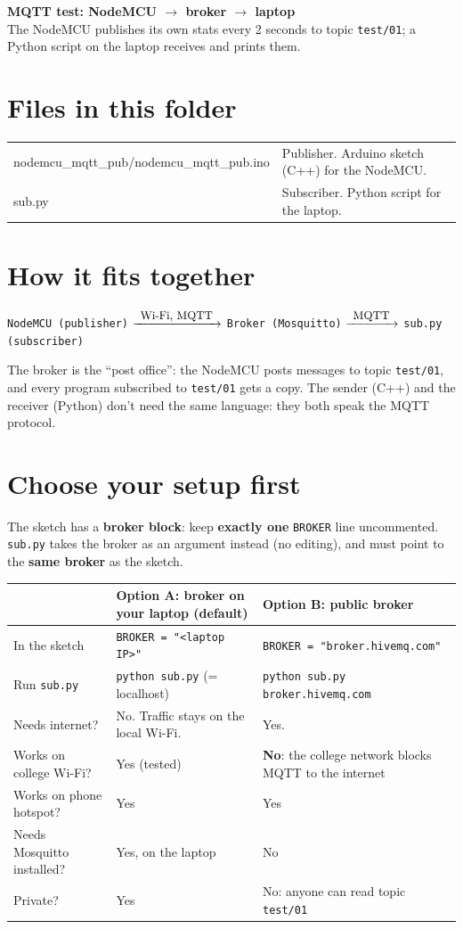 \documentclass[11pt]{article}
\begin{document}
{\LARGE\bfseries MQTT test: NodeMCU $\rightarrow$ broker $\rightarrow$ laptop}\\[4pt]
The NodeMCU publishes its own stats every 2 seconds to topic \texttt{test/01}; a Python script on the laptop receives and prints them.

\section*{Files in this folder}
\begin{tabular}{@{}>{\ttfamily}l l@{}}
nodemcu\_mqtt\_pub/nodemcu\_mqtt\_pub.ino & Publisher. Arduino sketch (C++) for the NodeMCU. \\
sub.py & Subscriber. Python script for the laptop. \\
\end{tabular}

\section*{How it fits together}
\begin{center}
\texttt{NodeMCU (publisher)} $\xrightarrow{\ \mbox{\small Wi-Fi, MQTT}\ }$
\texttt{Broker (Mosquitto)} $\xrightarrow{\ \mbox{\small MQTT}\ }$
\texttt{sub.py (subscriber)}
\end{center}
The broker is the ``post office'': the NodeMCU posts messages to topic \texttt{test/01}, and every program subscribed to \texttt{test/01} gets a copy.
The sender (C++) and the receiver (Python) don't need the same language: they both speak the MQTT protocol.

\section*{Choose your setup first}
The sketch has a \textbf{broker block}: keep \textbf{exactly one} \texttt{BROKER} line uncommented.
\texttt{sub.py} takes the broker as an argument instead (no editing), and must point to the \textbf{same broker} as the sketch.

\begin{tabular}{@{}>{\raggedright}p{3.6cm} >{\raggedright}p{6.2cm} >{\raggedright\arraybackslash}p{6.4cm}@{}}
\toprule
 & \textbf{Option A: broker on your laptop} (default) & \textbf{Option B: public broker} \\
\midrule
In the sketch & \texttt{BROKER = "<laptop IP>"} & \texttt{BROKER = "broker.hivemq.com"} \\
Run \texttt{sub.py} & \texttt{python sub.py} (= localhost) & \texttt{python sub.py broker.hivemq.com} \\
Needs internet? & No. Traffic stays on the local Wi-Fi. & Yes. \\
Works on college Wi-Fi? & Yes (tested) & \textbf{No}: the college network blocks MQTT to the internet \\
Works on phone hotspot? & Yes & Yes \\
Needs Mosquitto installed? & Yes, on the laptop & No \\
Private? & Yes & No: anyone can read topic \texttt{test/01} \\
\bottomrule
\end{tabular}
\end{document}
